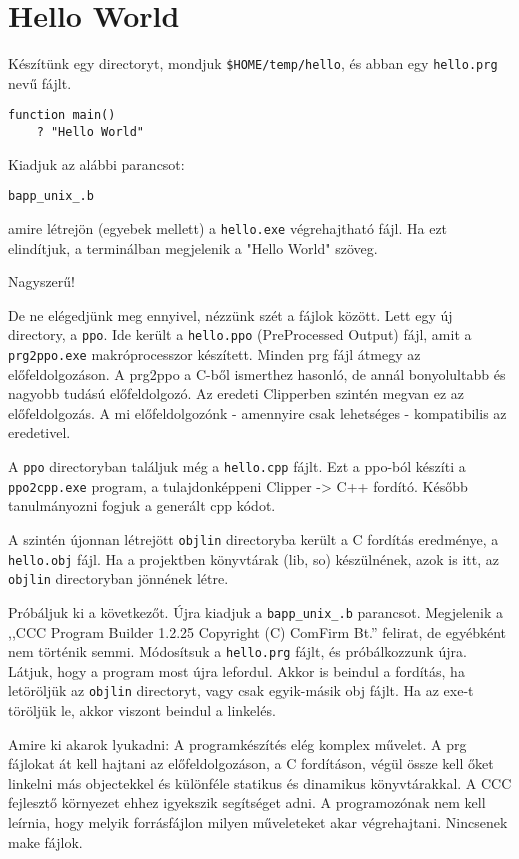 

\section{Hello World}

Készítünk egy directoryt, mondjuk \verb!$HOME/temp/hello!, és abban egy 
\verb!hello.prg! nevű fájlt.

\begin{verbatim}
function main()
    ? "Hello World"
\end{verbatim}

Kiadjuk az alábbi parancsot:

\begin{verbatim}
bapp_unix_.b
\end{verbatim}

amire létrejön (egyebek mellett) a \verb!hello.exe! végrehajtható fájl. 
Ha ezt elindítjuk, a terminálban megjelenik a "Hello World" szöveg.

Nagyszerű!


De ne elégedjünk meg ennyivel, nézzünk szét a fájlok között.
Lett egy új directory, a \verb!ppo!. Ide került a \verb!hello.ppo! (PreProcessed Output)
fájl, amit a \verb!prg2ppo.exe! makróprocesszor készített. Minden prg fájl átmegy
az előfeldolgozáson. A prg2ppo a C-ből ismerthez hasonló, de annál
bonyolultabb és nagyobb tudású előfeldolgozó. Az eredeti Clipperben szintén megvan
ez az előfeldolgozás. A mi előfeldolgozónk - amennyire csak lehetséges - kompatibilis
az eredetivel.

A \verb!ppo! directoryban találjuk még a \verb!hello.cpp! fájlt. Ezt a ppo-ból 
készíti a \verb!ppo2cpp.exe! program, a tulajdonképpeni Clipper -> C++ 
fordító. Később tanulmányozni fogjuk a generált cpp kódot.

A szintén újonnan létrejött \verb!objlin! directoryba került a C fordítás eredménye,
a \verb!hello.obj! fájl. Ha a projektben könyvtárak (lib, so) készülnének, azok is
itt, az \verb!objlin! directoryban jönnének létre.

Próbáljuk ki a következőt. Újra kiadjuk a \verb!bapp_unix_.b!
parancsot. Megjelenik a ,,CCC Program Builder 1.2.25 Copyright (C) ComFirm Bt.''
felirat, de egyébként nem történik semmi. Módosítsuk a \verb!hello.prg! fájlt,
és próbálkozzunk újra. Látjuk, hogy a program most újra lefordul. Akkor is 
beindul a fordítás, ha letöröljük az \verb!objlin! directoryt, vagy csak egyik-másik
obj fájlt. Ha az exe-t töröljük le, akkor viszont beindul a linkelés.

Amire ki akarok lyukadni: A programkészítés elég komplex művelet.
A prg fájlokat át kell hajtani az előfeldolgozáson, a C fordításon, végül össze kell
őket linkelni más objectekkel és különféle statikus és dinamikus könyvtárakkal.
A CCC fejlesztő környezet ehhez igyekszik segítséget adni. A programozónak nem
kell leírnia, hogy melyik forrásfájlon milyen műveleteket akar végrehajtani.
Nincsenek make fájlok.

